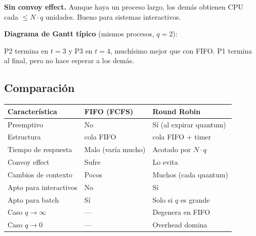 \documentclass[11pt,a4paper]{article}
\begin{document}
\textbf{Sin convoy effect.} Aunque haya un proceso largo, los demás
obtienen CPU cada $\leq N \cdot q$ unidades. Bueno para sistemas
interactivos.

\textbf{Diagrama de Gantt típico} (mismos procesos, $q = 2$):

\begin{center}
\end{center}

\noindent P2 termina en $t = 3$ y P3 en $t = 4$, muchísimo mejor que
con FIFO. P1 termina al final, pero no hace esperar a los demás.

\subsection*{Comparación}

\begin{center}
\small
\begin{tabular}{@{}p{4.5cm}p{4.5cm}p{4.5cm}@{}}
\toprule
Característica & FIFO (FCFS) & Round Robin \\
\midrule
Preemptivo                    & No                    & Sí (al expirar quantum) \\
Estructura                    & cola FIFO             & cola FIFO $+$ timer \\
Tiempo de respuesta           & Malo (varía mucho)    & Acotado por $N \cdot q$ \\
Convoy effect                 & Sufre                 & Lo evita \\
Cambios de contexto           & Pocos                 & Muchos (cada quantum) \\
Apto para interactivos        & No                    & Sí \\
Apto para batch               & Sí                    & Solo si $q$ es grande \\
Caso $q \to \infty$           & ---                   & Degenera en FIFO \\
Caso $q \to 0$                & ---                   & Overhead domina \\
\bottomrule
\end{tabular}
\end{center}
\end{document}
